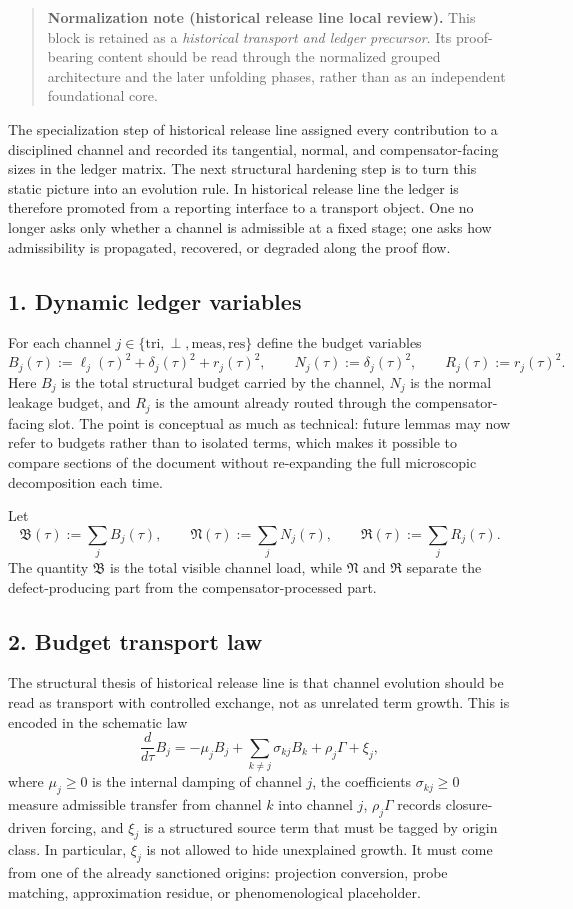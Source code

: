 \documentclass[12pt,a4paper]{article}
\DeclareRobustCommand{\QSCver}[1]{archival stage}
\renewcommand{\QSCver}[1]{historical release line}
\begin{document}
\begin{quote}
\textbf{Normalization note (\QSCver{v2.17.1} local review).}
This block is retained as a \emph{historical transport and ledger precursor}. Its proof-bearing content should be read through the normalized grouped architecture and the later unfolding phases, rather than as an independent foundational core.
\end{quote}

The specialization step of \QSCver{v2.4.0} assigned every contribution to a disciplined
channel and recorded its tangential, normal, and compensator-facing sizes in the
ledger matrix. The next structural hardening step is to turn this static picture
into an evolution rule. In \QSCver{v2.5.0} the ledger is therefore promoted from a
reporting interface to a transport object. One no longer asks only whether a
channel is admissible at a fixed stage; one asks how admissibility is propagated,
recovered, or degraded along the proof flow.

\subsection*{1. Dynamic ledger variables}
For each channel $j\in\{\mathrm{tri},\perp,\mathrm{meas},\mathrm{res}\}$ define the
budget variables
\[
B_j(\tau):=\ell_j(\tau)^2+\delta_j(\tau)^2+r_j(\tau)^2,
\qquad
N_j(\tau):=\delta_j(\tau)^2,
\qquad
R_j(\tau):=r_j(\tau)^2.
\]
Here $B_j$ is the total structural budget carried by the channel, $N_j$ is the
normal leakage budget, and $R_j$ is the amount already routed through the
compensator-facing slot. The point is conceptual as much as technical: future
lemmas may now refer to budgets rather than to isolated terms, which makes it
possible to compare sections of the document without re-expanding the full
microscopic decomposition each time.

Let
\[
\mathfrak B(\tau):=\sum_j B_j(\tau),
\qquad
\mathfrak N(\tau):=\sum_j N_j(\tau),
\qquad
\mathfrak R(\tau):=\sum_j R_j(\tau).
\]
The quantity $\mathfrak B$ is the total visible channel load, while
$\mathfrak N$ and $\mathfrak R$ separate the defect-producing part from the
compensator-processed part.

\subsection*{2. Budget transport law}
The structural thesis of \QSCver{v2.5.0} is that channel evolution should be read as
transport with controlled exchange, not as unrelated term growth. This is encoded
in the schematic law
\[
\frac{d}{d\tau}B_j
= -\mu_j B_j + \sum_{k\neq j}\sigma_{kj}B_k + \rho_j\Gamma + \xi_j,
\]
where $\mu_j\ge0$ is the internal damping of channel $j$, the coefficients
$\sigma_{kj}\ge0$ measure admissible transfer from channel $k$ into channel $j$,
$\rho_j\Gamma$ records closure-driven forcing, and $\xi_j$ is a structured source
term that must be tagged by origin class. In particular, $\xi_j$ is not allowed to
hide unexplained growth. It must come from one of the already sanctioned origins:
projection conversion, probe matching, approximation residue, or phenomenological
placeholder.
\end{document}
